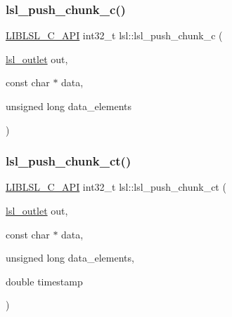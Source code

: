 \mbox{\label{namespacelsl_a3dd3622f5a0fcdedbc7bf4223a08ba01}} 
\subsubsection{\texorpdfstring{lsl\+\_\+push\+\_\+chunk\+\_\+c()}{lsl\_push\_chunk\_c()}}
{\footnotesize\ttfamily \hyperlink{lsl__cpp_8h_aafd0ef1813e8be84a1420c4f1df64615}{L\+I\+B\+L\+S\+L\+\_\+\+C\+\_\+\+A\+PI} int32\+\_\+t lsl\+::lsl\+\_\+push\+\_\+chunk\+\_\+c (\begin{DoxyParamCaption}\item[{\hyperlink{namespacelsl_abcf512b0f66dacf86c10b165995fd50b}{lsl\+\_\+outlet}}]{out,  }\item[{const char $\ast$}]{data,  }\item[{unsigned long}]{data\+\_\+elements }\end{DoxyParamCaption})}

\mbox{\label{namespacelsl_a9bad246099db9f07ccc795d14709eed7}} 
\subsubsection{\texorpdfstring{lsl\+\_\+push\+\_\+chunk\+\_\+ct()}{lsl\_push\_chunk\_ct()}}
{\footnotesize\ttfamily \hyperlink{lsl__cpp_8h_aafd0ef1813e8be84a1420c4f1df64615}{L\+I\+B\+L\+S\+L\+\_\+\+C\+\_\+\+A\+PI} int32\+\_\+t lsl\+::lsl\+\_\+push\+\_\+chunk\+\_\+ct (\begin{DoxyParamCaption}\item[{\hyperlink{namespacelsl_abcf512b0f66dacf86c10b165995fd50b}{lsl\+\_\+outlet}}]{out,  }\item[{const char $\ast$}]{data,  }\item[{unsigned long}]{data\+\_\+elements,  }\item[{double}]{timestamp }\end{DoxyParamCaption})}

\mbox{\label{namespacelsl_a2a72461381a3cfa39a33dc07312a72a6}} 
